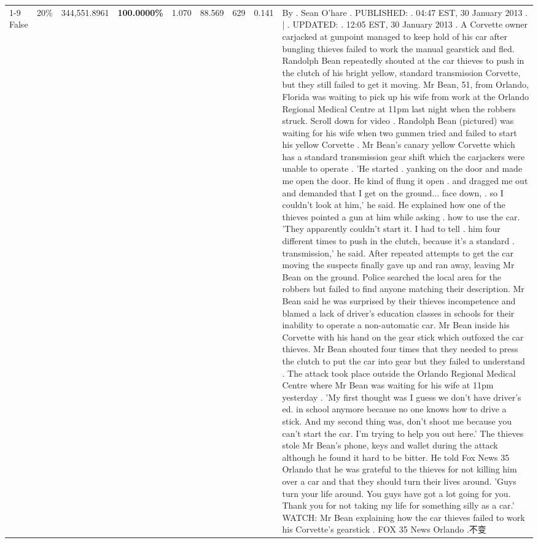 \begin{table}[H]
\begin{tabular}{lllrlllll}
\cline{1-9} \cline{2-9}
False & 20\% & 344,551.8961 & \bfseries \color{red} 100.0000\% & 1.070 & 88.569 & 629 & 0.141 & By . Sean O'hare . PUBLISHED: . 04:47 EST, 30 January 2013 . | . UPDATED: . 12:05 EST, 30 January 2013 . A Corvette owner carjacked at gunpoint managed to keep hold of his car after bungling thieves failed to work the manual gearstick and fled. Randolph Bean repeatedly shouted at the car thieves to push in the clutch of his bright yellow, standard transmission Corvette, but they still failed to get it moving. Mr Bean, 51, from Orlando, Florida was waiting to pick up his wife from work at the Orlando Regional Medical Centre at 11pm last night when the robbers struck. Scroll down for video . Randolph Bean (pictured) was waiting for his wife when two gunmen tried and failed to start his yellow Corvette . Mr Bean's canary yellow Corvette which has a standard transmission gear shift which the carjackers were unable to operate . 'He started . yanking on the door and made me open the door. He kind of flung it open . and dragged me out and demanded that I get on the ground... face down, . so I couldn't look at him,' he said. He explained how one of the thieves pointed a gun at him while asking . how to use the car. 'They apparently couldn't start it. I had to tell . him four different times to push in the clutch, because it's a standard . transmission,' he said. After repeated attempts to get the car moving the suspects finally gave up and ran away, leaving Mr Bean on the ground. Police searched the local area for the robbers but failed to find anyone matching their description. Mr Bean said he was surprised by their thieves incompetence and blamed a lack of driver's education classes in schools for their inability to operate a non-automatic car. Mr Bean inside his Corvette with his hand on the gear stick which outfoxed the car thieves. Mr Bean shouted four times that they needed to press the clutch to put the car into gear but they failed to understand . The attack took place outside the Orlando Regional Medical Centre where Mr Bean was waiting for his wife at 11pm yesterday . 'My first thought was I guess we don't have driver's ed. in school anymore because no one knows how to drive a stick. And my second thing was, don't shoot me because you can't start the car. I'm trying to help you out here.' The thieves stole Mr Bean's phone, keys and wallet during the attack although he found it hard to be bitter. He told Fox News 35 Orlando that he was grateful to the thieves for not killing him over a car and that they should turn their lives around. 'Guys turn your life around. You guys have got a lot going for you. Thank you for not taking my life for something silly as a car.' WATCH: Mr Bean explaining how the car thieves failed to work his Corvette's gearstick . FOX 35 News Orlando .不变 \\

\end{tabular}
\end{table}
